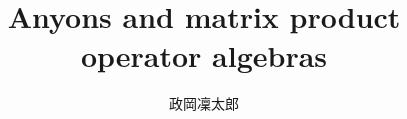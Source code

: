 \documentclass[12pt]{ltjsarticle}
\newcommand{\∩}[1]{
  \vcenter{\hbox{\scriptsize$#1$}}
}
\numberwithin{equation}{section}
\begin{document}
\title{Anyons and matrix product operator  algebras}
\author{政岡凜太郎}
\maketitle

\tableofcontents
\newpage

\newpage

\newpage

\newpage

\newpage

\newpage
\appendix
\def\thesection{\Alph{section}}

\newpage
\printbibliography
\end{document}
